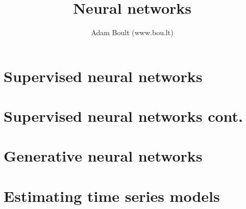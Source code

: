 \documentclass[oneside]{book}
\begin{document}
\author{Adam Boult (www.bou.lt)}
\title{Neural networks}
\maketitle

\setcounter{tocdepth}{0}
\tableofcontents



\part{Supervised neural networks}





\part{Supervised neural networks cont.}







\part{Generative neural networks}





\part{Estimating time series models}


\end{document}
